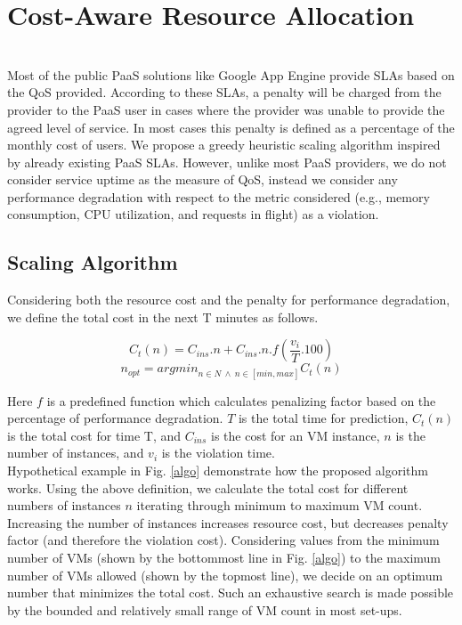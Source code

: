 \section{Cost-Aware Resource Allocation}\\
Most of the public PaaS solutions like Google App Engine provide SLAs based on the QoS provided. According to these SLAs, a penalty will be charged from the provider to the PaaS user in cases where the provider was unable to provide the agreed level of service. In most cases this penalty is defined as a percentage of the monthly cost of users. We propose a greedy heuristic scaling algorithm inspired by already existing PaaS SLAs. However, unlike most PaaS providers, we do not consider service uptime as the measure of QoS, instead we consider any performance degradation with respect to the metric considered (e.g., memory consumption, CPU utilization, and requests in flight) as a violation.

\subsection{Scaling Algorithm}
Considering both the resource cost and the penalty for performance degradation, we define the total cost in the next T minutes as follows.

\textbf{$$ C_t(n) = C_{ins}.n + C_{ins} . n . f(\frac{v_i}{T}.100) $$}
\textbf{$$n_{opt} = argmin_{n \in N \ \land \ n \in [min, max]}C_t(n)$$} 

Here $f$ is a predefined function which calculates penalizing factor based on the percentage of performance degradation. $T$ is the total time for prediction, $C_t(n)$ is the total cost for time T, and $C_{ins}$ is the cost for an VM instance, $n$ is the number of instances, and $v_i$ is the violation time. 
\\
Hypothetical example in Fig. \ref{algo} demonstrate how the proposed algorithm works. Using the above definition, we calculate the total cost for different numbers of instances $n$ iterating through minimum to maximum VM count. Increasing the number of instances increases resource cost, but decreases penalty factor (and therefore the violation cost). Considering values from the minimum number of VMs (shown by the bottommost line in Fig. \ref{algo}) to the maximum number of VMs allowed (shown by the topmost line), we decide on an optimum number that minimizes the total cost. Such an exhaustive search is made possible by the bounded and relatively small range of VM count in most set-ups.